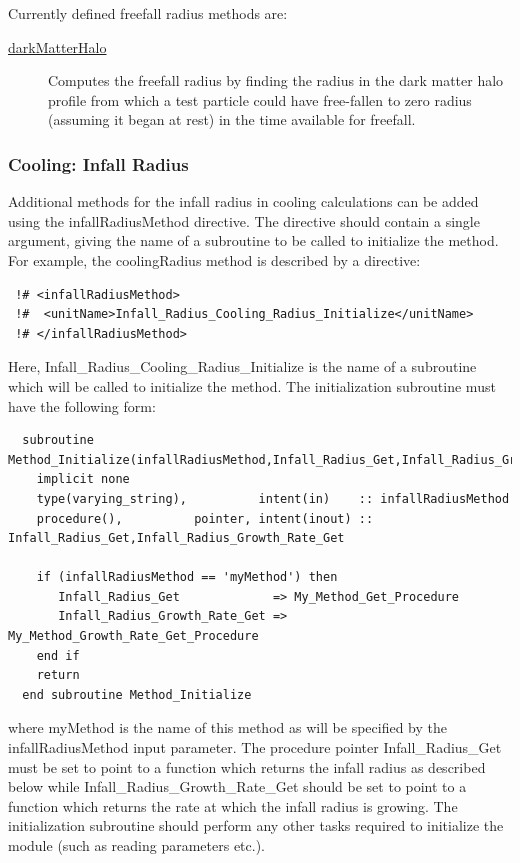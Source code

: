 Currently defined freefall radius methods are:
\begin{description}
 \item [\hyperlink{cooling.freefall_radii.dark_matter_halo.F90:freefall_radii_dark_matter_halo:freefall_radius_dark_matter_halo}{{\normalfont \ttfamily darkMatterHalo}}] Computes the freefall radius by finding the radius in the dark matter halo profile from which a test particle could have free-fallen to zero radius (assuming it began at rest) in the time available for freefall.
\end{description}

\subsubsection{Cooling: Infall Radius}

Additional methods for the infall radius in cooling calculations can be added using the {\normalfont \ttfamily infallRadiusMethod} directive. The directive should contain a single argument, giving the name of a subroutine to be called to initialize the method. For example, the {\normalfont \ttfamily coolingRadius} method is described by a directive:
\begin{verbatim}
 !# <infallRadiusMethod>
 !#  <unitName>Infall_Radius_Cooling_Radius_Initialize</unitName>
 !# </infallRadiusMethod>
\end{verbatim}
Here, {\normalfont \ttfamily Infall\_Radius\_Cooling\_Radius\_Initialize} is the name of a subroutine which will be called to initialize the method. The initialization subroutine must have the following form:
\begin{verbatim}
  subroutine Method_Initialize(infallRadiusMethod,Infall_Radius_Get,Infall_Radius_Growth_Rate_Get)
    implicit none
    type(varying_string),          intent(in)    :: infallRadiusMethod
    procedure(),          pointer, intent(inout) :: Infall_Radius_Get,Infall_Radius_Growth_Rate_Get
    
    if (infallRadiusMethod == 'myMethod') then
       Infall_Radius_Get             => My_Method_Get_Procedure
       Infall_Radius_Growth_Rate_Get => My_Method_Growth_Rate_Get_Procedure
    end if
    return
  end subroutine Method_Initialize
\end{verbatim}
where {\normalfont \ttfamily myMethod} is the name of this method as will be specified by the {\normalfont \ttfamily infallRadiusMethod} input parameter. The procedure pointer {\normalfont \ttfamily Infall\_Radius\_Get} must be set to point to a function which returns the infall radius as described below while {\normalfont \ttfamily Infall\_Radius\_Growth\_Rate\_Get} should be set to point to a function which returns the rate at which the infall radius is growing. The initialization subroutine should perform any other tasks required to initialize the module (such as reading parameters etc.).

